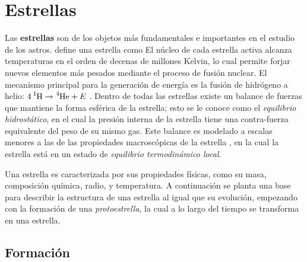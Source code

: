 \section{Estrellas}

Las \textbf{estrellas} son de los objetos más fundamentales e importantes en el
estudio de los astros.  define una
estrella como 
El núcleo de cada estrella activa alcanza temperaturas en el orden de decenas de
millones Kelvin, lo cual permite forjar nuevos elementos más pesados mediante el
proceso de fusión nuclear. El mecanismo principal para la generación de energía
es la fusión de hidrógeno a helio: $\ce{4 ^1H} \rightarrow \ce{^4He} + E$ .
Dentro de todas las estrellas existe un balance de fuerzas que mantiene la forma
esférica de la estrella; esto se le conoce como el \textit{equilibrio
hidrostático}, en el cual la presión interna de la estrella tiene una
contra-fuerza equivalente del peso de su mismo gas. Este balance es modelado a
escalas menores a las de las propiedades macroscópicas de la estrella
, en la cual la
estrella está en un estado de \textit{equilibrio termodinámico local}. 

Una estrella es caracterizada por sus propiedades físicas, como su masa,
composición química, radio, y temperatura. A continuación se planta una base
para describir la estructura de una estrella al igual que su evolución,
empezando con la formación de una \textit{protoestrella}, la cual a lo largo del
tiempo se transforma en una estrella.


\subsection{Formación}


